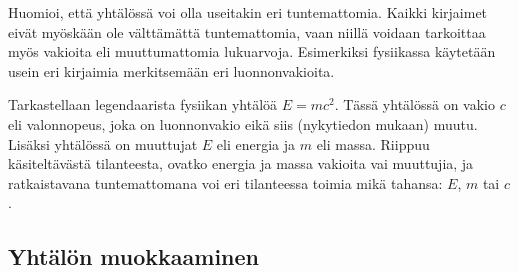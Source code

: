 Huomioi, että yhtälössä voi olla useitakin eri tuntemattomia. Kaikki kirjaimet eivät myöskään ole välttämättä tuntemattomia, vaan niillä voidaan tarkoittaa myös vakioita eli muuttumattomia lukuarvoja. Esimerkiksi fysiikassa käytetään usein eri kirjaimia merkitsemään eri luonnonvakioita.

\begin{esimerkki}
Tarkastellaan legendaarista fysiikan yhtälöä $E=mc^2$. Tässä yhtälössä on vakio $c$ eli valonnopeus, joka on luonnonvakio eikä siis (nykytiedon mukaan) muutu. Lisäksi yhtälössä on muuttujat $E$ eli energia ja $m$ eli massa. Riippuu käsiteltävästä tilanteesta, ovatko energia ja massa vakioita vai muuttujia, ja ratkaistavana tuntemattomana voi eri tilanteessa toimia mikä tahansa: $E$, $m$ tai $c$.
\end{esimerkki}

\subsection{Yhtälön muokkaaminen}



